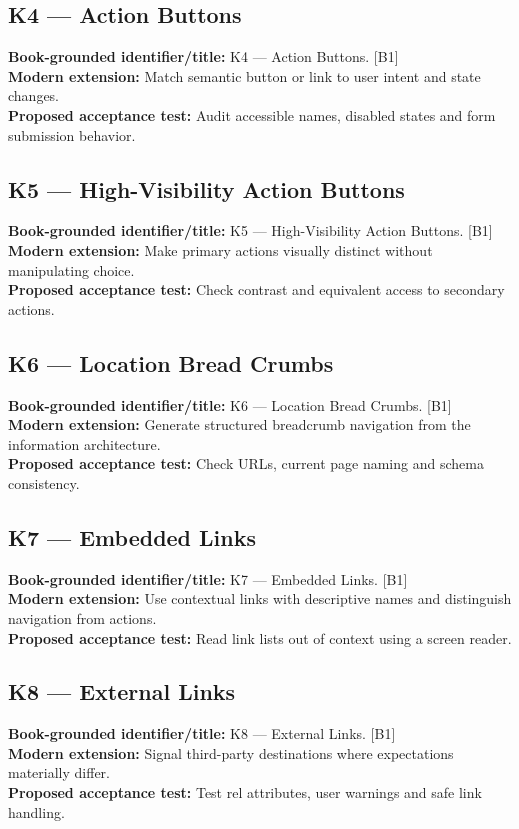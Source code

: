 \documentclass[11pt]{article}
\begin{document}
\subsection{K4 — Action Buttons}
\noindent\textcolor{Ocean}{\textbf{Book-grounded identifier/title:}} K4 — Action Buttons. [B1]\\
\textcolor{Mint}{\textbf{Modern extension:}} Match semantic button or link to user intent and state changes.\\
\textcolor{Amber}{\textbf{Proposed acceptance test:}} Audit accessible names, disabled states and form submission behavior.\medskip
\subsection{K5 — High-Visibility Action Buttons}
\noindent\textcolor{Ocean}{\textbf{Book-grounded identifier/title:}} K5 — High-Visibility Action Buttons. [B1]\\
\textcolor{Mint}{\textbf{Modern extension:}} Make primary actions visually distinct without manipulating choice.\\
\textcolor{Amber}{\textbf{Proposed acceptance test:}} Check contrast and equivalent access to secondary actions.\medskip
\subsection{K6 — Location Bread Crumbs}
\noindent\textcolor{Ocean}{\textbf{Book-grounded identifier/title:}} K6 — Location Bread Crumbs. [B1]\\
\textcolor{Mint}{\textbf{Modern extension:}} Generate structured breadcrumb navigation from the information architecture.\\
\textcolor{Amber}{\textbf{Proposed acceptance test:}} Check URLs, current page naming and schema consistency.\medskip
\subsection{K7 — Embedded Links}
\noindent\textcolor{Ocean}{\textbf{Book-grounded identifier/title:}} K7 — Embedded Links. [B1]\\
\textcolor{Mint}{\textbf{Modern extension:}} Use contextual links with descriptive names and distinguish navigation from actions.\\
\textcolor{Amber}{\textbf{Proposed acceptance test:}} Read link lists out of context using a screen reader.\medskip
\subsection{K8 — External Links}
\noindent\textcolor{Ocean}{\textbf{Book-grounded identifier/title:}} K8 — External Links. [B1]\\
\textcolor{Mint}{\textbf{Modern extension:}} Signal third-party destinations where expectations materially differ.\\
\textcolor{Amber}{\textbf{Proposed acceptance test:}} Test rel attributes, user warnings and safe link handling.\medskip
\end{document}
